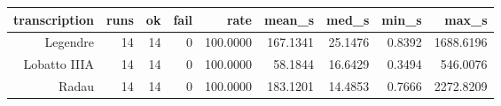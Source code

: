 {\footnotesize
\begin{longtable}{|r|r|r|r|r|r|r|r|r|}
  \hline
  \textbf{transcription} & \textbf{runs} & \textbf{ok} & \textbf{fail} & \textbf{rate} & \textbf{mean\_s} & \textbf{med\_s} & \textbf{min\_s} & \textbf{max\_s} \\
  \hline
  Legendre & 14 & 14 & 0 & 100.0000 & 167.1341 & 25.1476 & 0.8392 & 1688.6196 \\
  Lobatto IIIA & 14 & 14 & 0 & 100.0000 & 58.1844 & 16.6429 & 0.3494 & 546.0076 \\
  Radau & 14 & 14 & 0 & 100.0000 & 183.1201 & 14.4853 & 0.7666 & 2272.8209 \\
  \hline
\end{longtable}
}

